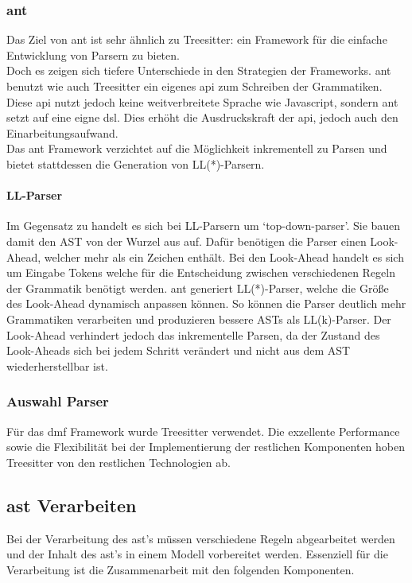 \documentclass[./einleitung.tex]{subfiles}
\begin{document}
\subsubsection{\acrfull{ant}}
Das Ziel von \acrshort{ant} ist sehr ähnlich zu Treesitter: ein Framework für die einfache Entwicklung von Parsern zu bieten. \\
Doch es zeigen sich tiefere Unterschiede in den Strategien der Frameworks.
\acrshort{ant} benutzt wie auch Treesitter ein eigenes \acrfull{api} zum Schreiben der Grammatiken.
Diese \acrshort{api} nutzt jedoch keine weitverbreitete Sprache wie Javascript, sondern \acrshort{ant} setzt auf eine eigne \acrfull{dsl}.
Dies erhöht die Ausdruckskraft der \acrshort{api}, jedoch auch den Einarbeitungsaufwand.\\
Das \acrshort{ant} Framework verzichtet auf die Möglichkeit inkrementell zu Parsen und bietet stattdessen die Generation von LL(*)-Parsern.

\paragraph{LL-Parser} Im Gegensatz zu  handelt es sich bei LL-Parsern um `top-down-parser'.
Sie bauen damit den AST von der Wurzel aus auf.
Dafür benötigen die Parser einen Look-Ahead, welcher mehr als ein Zeichen enthält.
Bei den Look-Ahead handelt es sich um Eingabe Tokens welche für die Entscheidung zwischen verschiedenen Regeln der Grammatik benötigt werden.
\acrshort{ant} generiert LL(*)-Parser, welche die Größe des Look-Ahead dynamisch anpassen können.
So können die Parser deutlich mehr Grammatiken verarbeiten und produzieren bessere ASTs als LL(k)-Parser. \cite{parr2011ll}
Der Look-Ahead verhindert jedoch das inkrementelle Parsen, da der Zustand des Look-Aheads sich bei jedem Schritt verändert und nicht aus dem AST wiederherstellbar ist.

\subsubsection{Auswahl Parser}
Für das \acrshort{dmf} Framework wurde Treesitter verwendet.
Die exzellente Performance sowie die Flexibilität bei der Implementierung der restlichen Komponenten hoben Treesitter von den restlichen Technologien ab.


\subsection{\acrshort{ast} Verarbeiten}
Bei der Verarbeitung des \acrshort{ast}'s müssen verschiedene Regeln abgearbeitet werden und der Inhalt des \acrshort{ast}'s in einem Modell vorbereitet werden.
Essenziell für die Verarbeitung ist die Zusammenarbeit mit den folgenden Komponenten.
\end{document}
